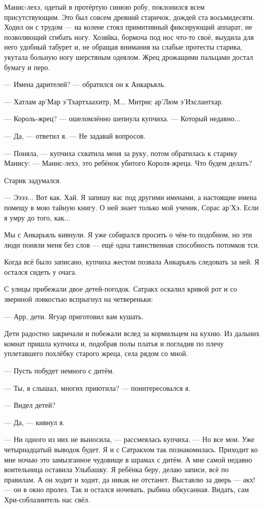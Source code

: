 Манис-лехэ, одетый в протёртую синюю робу, поклонился всем присутствующим.
Это был совсем древний старичок, дождей ста восьмидесяти.
Ходил он с трудом --- на колене стоял примитивный фиксирующий аппарат, не позволяющий сгибать ногу.
Хозяйка, бормоча под нос что-то своё, выудила для него удобный табурет и, не обращая внимания на слабые протесты старика, укутала больную ногу шерстяным одеялом.
Жрец дрожащими пальцами достал бумагу и перо.

--- Имена дарителей? --- обратился он к Анкарьяль.

--- Хатлам ар’Мар э’Тхартхаахитр, М... Митрис ар’Люм э’Ихслантхар.

--- Король-жрец? --- ошеломлённо шепнула купчиха.
--- Который недавно...

--- Да, --- ответил я.
--- Не задавай вопросов.

--- Поняла, --- купчиха схватила меня за руку, потом обратилась к старику Манису:
--- Манис-лехэ, это ребёнок убитого Короля-жреца.
Что будем делать?

Старик задумался.

--- Ээээ...
Вот как.
Хай.
Я запишу вас под другими именами, а настоящие имена помещу в мою тайную книгу.
О ней знает только мой ученик, Сорас ар’Хэ.
Если я умру до того, как...

Мы с Анкарьяль кивнули.
Я уже собирался просить о чём-то подобном, но эти люди поняли меня без слов --- ещё одна таинственная способность потомков тси.

Когда всё было записано, купчиха жестом позвала Анкарьяль следовать за ней.
Я остался сидеть у очага.

С улицы прибежали двое детей-погодок.
Сатракх оскалил кривой рот и со звериной ловкостью вспрыгнул на четвереньки:

--- Арр, дети.
Ягуар приготовил вам кушать.

Дети радостно закричали и побежали вслед за кормильцем на кухню.
Из дальних комнат пришла купчиха и, подобрав полы платья и погладив по плечу уплетавшего похлёбку старого жреца, села рядом со мной.

--- Пусть побудет немного с дитём.

--- Ты, я слышал, многих приютила? --- поинтересовался я.

--- Видел детей?

--- Да, --- кивнул я.

--- Ни одного из них не выносила, --- рассмеялась купчиха.
--- Но все мои.
Уже четырнадцатый выводок будет.
Я и с Сатракхом так познакомилась.
Приходит ко мне ночью это замызганное чудовище в шрамах с дитём.
А мне самой недавно воительница оставила Улыбашку.
Я ребёнка беру, делаю записи, всё по правилам.
А он ходит и ходит, да никак не отстанет.
Выставлю за дверь --- акх! --- он в окно пролез.
Так и остался ночевать, рыбина обкусанная.
Видать, сам Хри-соблазнитель нас свёл.

